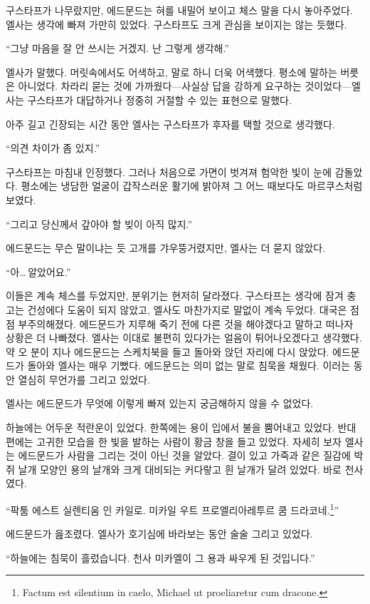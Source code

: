 구스타프가 나무랐지만, 에드문드는 혀를 내밀어 보이고 체스 말을 다시 놓아주었다. 엘사는 생각에 빠져 가만히 있었다. 구스타프도 크게 관심을 보이지는 않는 듯했다.

``그냥 마음을 잘 안 쓰시는 거겠지. 난 그렇게 생각해.''

엘사가 말했다. 머릿속에서도 어색하고, 말로 하니 더욱 어색했다. 평소에 말하는 버릇은 아니었다. 차라리 묻는 것에 가까웠다—사실상 답을 강하게 요구하는 것이었다—엘사는 구스타프가 대답하거나 정중히 거절할 수 있는 표현으로 말했다.

아주 길고 긴장되는 시간 동안 엘사는 구스타프가 후자를 택할 것으로 생각했다.

``의견 차이가 좀 있지.''

구스타프는 마침내 인정했다. 그러나 처음으로 가면이 벗겨져 험악한 빛이 눈에 감돌았다. 평소에는 냉담한 얼굴이 갑작스러운 활기에 밝아져 그 어느 때보다도 마르쿠스처럼 보였다.

``그리고 당신께서 갚아야 할 빚이 아직 많지.''

에드문드는 무슨 말이냐는 듯 고개를 갸우뚱거렸지만, 엘사는 더 묻지 않았다.

``아\ldots\,알았어요.''

이들은 계속 체스를 두었지만, 분위기는 현저히 달라졌다. 구스타프는 생각에 잠겨 충고는 건성에다 도움이 되지 않았고, 엘사도 마찬가지로 말없이 계속 두었다. 대국은 점점 부주의해졌다. 에드문드가 지루해 죽기 전에 다른 것을 해야겠다고 말하고 떠나자 상황은 더 나빠졌다. 엘사는 이대로 불편히 있다가는 얼음이 튀어나오겠다고 생각했다. 약 오 분이 지나 에드문드는 스케치북을 들고 돌아와 앉던 자리에 다시 앉았다. 에드문드가 돌아와 엘사는 매우 기뻤다. 에드문드는 의미 없는 말로 침묵을 채웠다. 이러는 동안 열심히 무언가를 그리고 있었다.

엘사는 에드문드가 무엇에 이렇게 빠져 있는지 궁금해하지 않을 수 없었다.

하늘에는 어두운 적란운이 있었다. 한쪽에는 용이 입에서 불을 뿜어내고 있었다. 반대편에는 고귀한 모습을 한 빛을 발하는 사람이 황금 창을 들고 있었다. 자세히 보자 엘사는 에드문드가 사람을 그리는 것이 아닌 것을 알았다. 결이 있고 가죽과 같은 질감에 박쥐 날개 모양인 용의 날개와 크게 대비되는 커다랗고 흰 날개가 달려 있었다. 바로 천사였다.

``팍툼 에스트 실렌티움 인 카일로. 미카일 우트 프로엘리아레투르 쿰 드라코네.\footnote{Factum est silentium in caelo, Michael ut proeliaretur cum dracone.}''

에드문드가 읊조렸다. 엘사가 호기심에 바라보는 동안 술술 그리고 있었다.

``하늘에는 침묵이 흘렀습니다. 천사 미카엘이 그 용과 싸우게 된 것입니다.''

